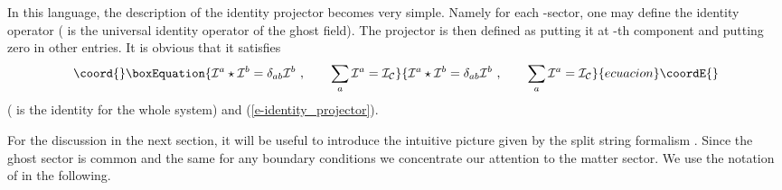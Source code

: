 \documentclass[a4paper,12pt]{article}
\begin{document}
In this language, the description of the identity projector
becomes very simple.  Namely for each \coordHE{}-sector, one may define
the identity operator \coordHE{}
(\coordHE{} is the universal identity operator of the ghost field).
The projector \coordHE{} is then
defined as putting it at \coordHE{}-th component and putting zero
in other entries.  It is obvious that it satisfies 
\begin{equation}\coord{}\boxEquation{
 \cI^a\star\cI^b=\delta_{ab}\cI^b\,\,,\qquad
 \sum_{a}\cI^a=\cI_{\cC}
}{
 \cI^a\star\cI^b=\delta_{ab}\cI^b\,\,,\qquad
 \sum_{a}\cI^a=\cI_{\cC}
}{ecuacion}\coordE{}\end{equation}
(\myHighlight{$\cI_\cC$}\coordHE{} is the identity for the whole system) 
and (\ref{e-identity_projector}).

For the discussion in the next section, it will be
useful to introduce the intuitive picture given by
the split string formalism \cite{r-GT1, r-GT2,
r-KO, r-AAB}.  Since the ghost sector
is common and the same for any boundary conditions we
concentrate our attention to the matter sector. We use
the notation of \cite{r-GT1, r-GT2} in the following.
\end{document}
